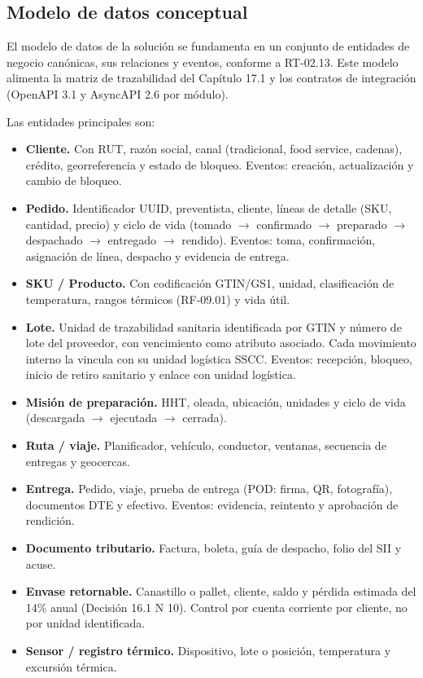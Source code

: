 \subsection{Modelo de datos conceptual}

El modelo de datos de la solución se fundamenta en un conjunto de entidades de negocio canónicas, sus relaciones y eventos, conforme a RT-02.13. Este modelo alimenta la matriz de trazabilidad del Capítulo 17.1 y los contratos de integración (OpenAPI 3.1 y AsyncAPI 2.6 por módulo).

Las entidades principales son:

\begin{itemize}
  \item \textbf{Cliente.} Con RUT, razón social, canal (tradicional, food service, cadenas), crédito, georreferencia y estado de bloqueo. Eventos: creación, actualización y cambio de bloqueo.
  \item \textbf{Pedido.} Identificador UUID, preventista, cliente, líneas de detalle (SKU, cantidad, precio) y ciclo de vida (tomado $\rightarrow$ confirmado $\rightarrow$ preparado $\rightarrow$ despachado $\rightarrow$ entregado $\rightarrow$ rendido). Eventos: toma, confirmación, asignación de línea, despacho y evidencia de entrega.
  \item \textbf{SKU / Producto.} Con codificación GTIN/GS1, unidad, clasificación de temperatura, rangos térmicos (RF-09.01) y vida útil.
  \item \textbf{Lote.} Unidad de trazabilidad sanitaria identificada por GTIN y número de lote del proveedor, con vencimiento como atributo asociado. Cada movimiento interno la vincula con su unidad logística SSCC. Eventos: recepción, bloqueo, inicio de retiro sanitario y enlace con unidad logística.
  \item \textbf{Misión de preparación.} HHT, oleada, ubicación, unidades y ciclo de vida (descargada $\rightarrow$ ejecutada $\rightarrow$ cerrada).
  \item \textbf{Ruta / viaje.} Planificador, vehículo, conductor, ventanas, secuencia de entregas y geocercas.
  \item \textbf{Entrega.} Pedido, viaje, prueba de entrega (POD: firma, QR, fotografía), documentos DTE y efectivo. Eventos: evidencia, reintento y aprobación de rendición.
  \item \textbf{Documento tributario.} Factura, boleta, guía de despacho, folio del SII y acuse.
  \item \textbf{Envase retornable.} Canastillo o pallet, cliente, saldo y pérdida estimada del 14\% anual (Decisión 16.1 N\textdegree{} 10). Control por cuenta corriente por cliente, no por unidad identificada.
  \item \textbf{Sensor / registro térmico.} Dispositivo, lote o posición, temperatura y excursión térmica.
\end{itemize}


